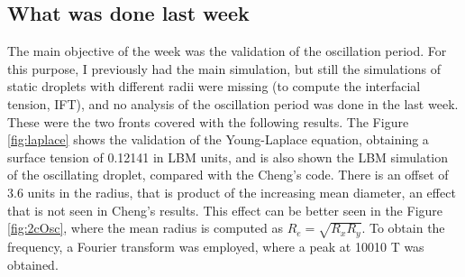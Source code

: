 \documentclass[12pt]{article}
\begin{document}
	\subsection*{What was done last week}
	The main objective of the week was the validation of the oscillation period. For this purpose, I previously had the main simulation, but still the simulations of static droplets with different radii were missing (to compute the interfacial tension, IFT), and no analysis of the oscillation period was done in the last week. These were the two fronts covered with the following results. The Figure \ref{fig:laplace} shows the validation of the Young-Laplace equation, obtaining a surface tension of 0.12141 in LBM units, and is also shown the LBM simulation of the oscillating droplet, compared with the Cheng's code. There is an offset of 3.6 units in the radius, that is product of the increasing mean diameter, an effect that is not seen in Cheng's results. This effect can be better seen in the Figure \ref{fig:2cOsc}, where the mean radius is computed as $R_e = \sqrt{R_x R_y}$. To obtain the frequency, a Fourier transform was employed, where a peak at 10010 T was obtained. 
\end{document}
